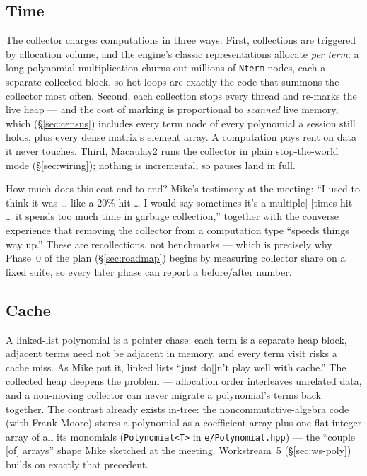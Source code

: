 \documentclass[11pt,oneside]{report}
\newcommand{\code}[1]{\textcolor{m2code}{\texttt{#1}}}
\newcommand{\file}[1]{\textcolor{m2file}{\texttt{#1}}}
\begin{document}
\subsection{Time}

The collector charges computations in three ways. First, collections are
triggered by allocation volume, and the engine's classic representations
allocate \emph{per term}: a long polynomial multiplication churns out
millions of \code{Nterm} nodes, each a separate collected block, so hot
loops are exactly the code that summons the collector most often. Second,
each collection stops every thread and re-marks the live heap --- and the
cost of marking is proportional to \emph{scanned} live memory, which
(\S\ref{sec:census}) includes every term node of every polynomial a session
still holds, plus every dense matrix's element array. A computation pays
rent on data it never touches. Third, Macaulay2 runs the collector in plain
stop-the-world mode (\S\ref{sec:wiring}); nothing is incremental, so pauses
land in full.

How much does this cost end to end? Mike's testimony at the meeting: ``I
used to think it was \ldots{} like a 20\% hit \ldots{} I would say sometimes
it's a multiple[-]times hit \ldots{} it spends too much time in garbage
collection,'' together with the converse experience that removing the
collector from a computation type ``speeds things way up.'' These are
recollections, not benchmarks --- which is precisely why Phase~0 of the
plan (\S\ref{sec:roadmap}) begins by measuring collector share on a fixed
suite, so every later phase can report a before/after number.

\subsection{Cache}

A linked-list polynomial is a pointer chase: each term is a separate heap
block, adjacent terms need not be adjacent in memory, and every term visit
risks a cache miss. As Mike put it, linked lists ``just do[]n't play well
with cache.'' The collected heap deepens the problem --- allocation order
interleaves unrelated data, and a non-moving collector can never migrate a
polynomial's terms back together. The contrast already exists in-tree: the
noncommutative-algebra code (with Frank Moore) stores a polynomial as a
coefficient array plus one flat integer array of all its monomials
(\code{Polynomial<T>} in \file{e/Polynomial.hpp}) --- the
``couple [of] arrays'' shape Mike sketched at the meeting. Workstream~5
(\S\ref{sec:ws-poly}) builds on exactly that precedent.
\end{document}
